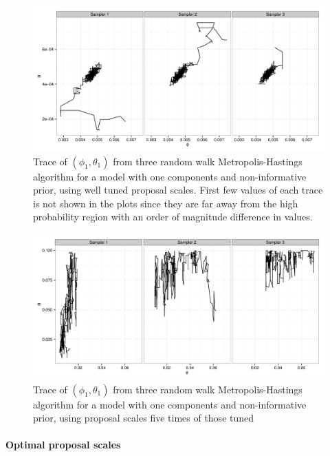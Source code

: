 \begin{figure}
  \includegraphics[width=\linewidth]{fig/PET_MH_Path.pdf}
  \caption{Trace of $(\phi_1,\theta_1)$ from three random walk
    Metropolis-Hastings algorithm for a \pet model with one components and
    non-informative prior, using well tuned proposal scales. First few values
    of each trace is not shown in the plots since they are far away from the
    high probability region with an order of magnitude difference in values.}
  \label{fig:pet mh tuned}
\end{figure}

\begin{figure}
  \includegraphics[width=\linewidth]{fig/PET_MH_H_Path.pdf}
  \caption{Trace of $(\phi_1,\theta_1)$ from three random walk
    Metropolis-Hastings algorithm for a \pet model with one components and
    non-informative prior, using proposal scales five times of those tuned}
  \label{fig:pet mh untuned}
\end{figure}

\paragraph{Optimal proposal scales}

